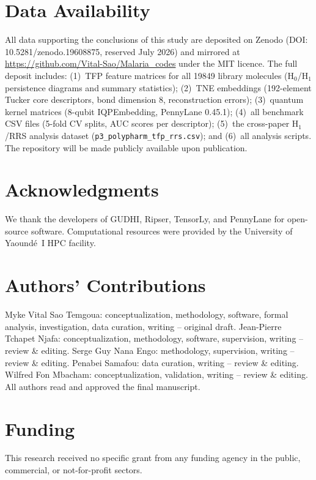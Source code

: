 \documentclass[11pt,a4paper]{article}
\begin{document}
\section*{Data Availability}

All data supporting the conclusions of this study are deposited on Zenodo (DOI: 10.5281/zenodo.19608875, reserved July 2026) and mirrored at 
\url{https://github.com/Vital-Sao/Malaria_codes} under the MIT licence. The full deposit includes: (1)~TFP feature matrices for all \num{19849} library 
molecules (H$_0$/H$_1$ persistence diagrams and summary statistics); (2)~TNE embeddings (\num{192}-element Tucker core descriptors, bond dimension 8, 
reconstruction errors); (3)~quantum kernel matrices (8-qubit IQPEmbedding, PennyLane 0.45.1); (4)~all benchmark CSV files (5-fold CV splits, AUC scores per 
descriptor); (5)~the cross-paper H$_1$/RRS analysis dataset (\texttt{p3\_polypharm\_tfp\_rrs.csv}); and (6)~all analysis scripts. The repository will be made 
publicly available upon publication.

\section*{Acknowledgments}

We thank the developers of GUDHI, Ripser, TensorLy, and PennyLane for open-source software. Computational resources were provided by the University of Yaound\'{e}~I HPC facility.

\section*{Authors' Contributions}

Myke Vital Sao Temgoua: conceptualization, methodology, 
software, formal analysis, investigation, data curation, writing -- original draft. Jean-Pierre Tchapet Njafa: conceptualization, methodology, software, 
supervision, writing -- review \& editing. Serge Guy Nana Engo: methodology, supervision, writing -- review \& editing. Penabei Samafou: data curation, writing 
-- review \& editing. Wilfred Fon Mbacham: conceptualization, validation, writing -- review \& editing. All authors read and approved the final manuscript.

\section*{Funding}

This research received no specific grant from any funding agency in 
the public, commercial, or not-for-profit sectors.
\end{document}
